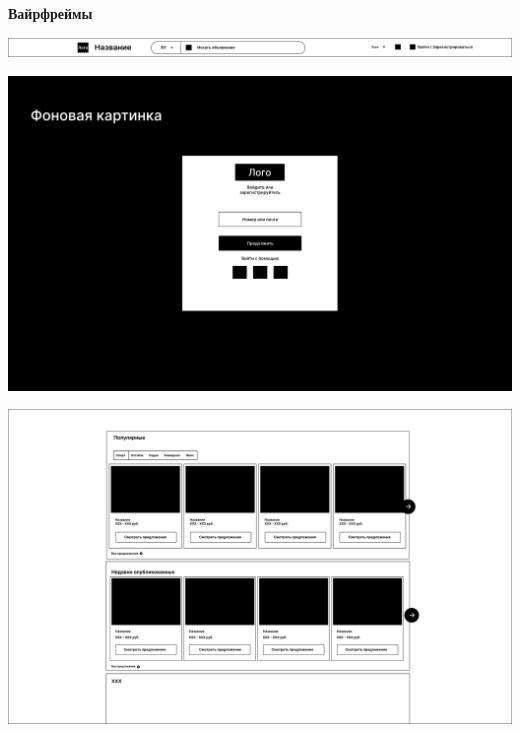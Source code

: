 \textbf{Вайрфреймы}
\bigskip

\noindent
\begin{minipage}{\linewidth}
    \includegraphics[width=\linewidth]{Header}
\end{minipage}
\bigskip

\noindent
\begin{minipage}{\linewidth}
    \includegraphics[width=\linewidth]{Auth}
\end{minipage}
\bigskip

\noindent
\begin{minipage}{\linewidth}
    \includegraphics[width=\linewidth]{Main}
\end{minipage}
\bigskip

